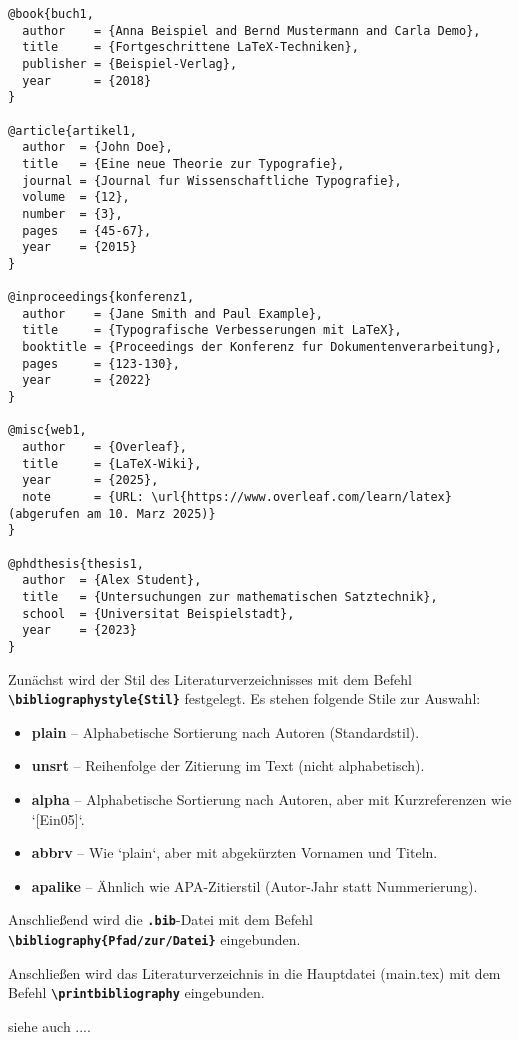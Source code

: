 \begin{lstlisting}[language={[LaTeX]TeX}, caption={Beispiel für eine \texttt{.bib}-Datei}]
@book{buch1,
  author    = {Anna Beispiel and Bernd Mustermann and Carla Demo},
  title     = {Fortgeschrittene LaTeX-Techniken},
  publisher = {Beispiel-Verlag},
  year      = {2018}
}

@article{artikel1,
  author  = {John Doe},
  title   = {Eine neue Theorie zur Typografie},
  journal = {Journal fur Wissenschaftliche Typografie},
  volume  = {12},
  number  = {3},
  pages   = {45-67},
  year    = {2015}
}

@inproceedings{konferenz1,
  author    = {Jane Smith and Paul Example},
  title     = {Typografische Verbesserungen mit LaTeX},
  booktitle = {Proceedings der Konferenz fur Dokumentenverarbeitung},
  pages     = {123-130},
  year      = {2022}
}

@misc{web1,
  author    = {Overleaf},
  title     = {LaTeX-Wiki},
  year      = {2025},
  note      = {URL: \url{https://www.overleaf.com/learn/latex} (abgerufen am 10. Marz 2025)}
}

@phdthesis{thesis1,
  author  = {Alex Student},
  title   = {Untersuchungen zur mathematischen Satztechnik},
  school  = {Universitat Beispielstadt},
  year    = {2023}
}
\end{lstlisting}

Zunächst wird der Stil des Literaturverzeichnisses mit dem Befehl \textbf{\texttt{\textbackslash bibliographystyle\{Stil\}}} festgelegt.
Es stehen folgende Stile zur Auswahl:
\begin{itemize}
    \item \textbf{plain} – Alphabetische Sortierung nach Autoren (Standardstil).
    \item \textbf{unsrt} – Reihenfolge der Zitierung im Text (nicht alphabetisch).
    \item \textbf{alpha} – Alphabetische Sortierung nach Autoren, aber mit Kurzreferenzen wie `[Ein05]`.
    \item \textbf{abbrv} – Wie `plain`, aber mit abgekürzten Vornamen und Titeln.
    \item \textbf{apalike} – Ähnlich wie APA-Zitierstil (Autor-Jahr statt Nummerierung).
\end{itemize}

Anschließend wird die \textbf{\texttt{.bib}}-Datei mit dem Befehl \textbf{\texttt{\textbackslash bibliography\{Pfad/zur/Datei\}}} eingebunden.

Anschließen wird das Literaturverzeichnis in die Hauptdatei (main.tex) mit dem Befehl \textbf{\texttt{\textbackslash printbibliography}} eingebunden.

siehe auch ....

